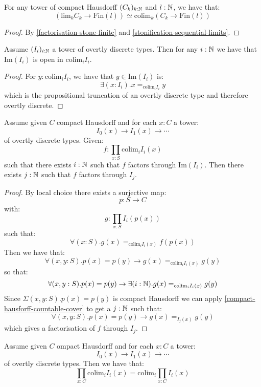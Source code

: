 \begin{lemma}\label{factorisation-compact-hausdorff-finite}
For any tower of compact Hausdorff $(C_k)_{k:\mathbb{N}}$ and $l:\mathbb{N}$, we have that:
\[\left(\mathrm{lim}_kC_k\to \mathrm{Fin}(l)\right) \simeq \mathrm{colim}_k (C_k\to \mathrm{Fin}(l))\]
\end{lemma}

\begin{proof}
By \cref{factorisation-stone-finite} and \cref{stonification-sequential-limits}.
\end{proof}

\begin{lemma}\label{overtly-discrete-union-open}
Assume $(I_i)_{i:\mathbb{N}}$ a tower of overtly discrete types. Then for any $i:\mathbb{N}$ we have that $\mathrm{Im}(I_i)$ is open in $\mathrm{colim}_i I_i$. 
\end{lemma}

\begin{proof}
For $y:\mathrm{colim}_iI_i$, we have that $y\in \mathrm{Im}(I_i)$ is:
\[\exists(x:I_i). x=_{\mathrm{colim}_iI_i}y\]
which is the propositional truncation of an overtly discrete type and therefore overtly discrete.
\end{proof}


\begin{lemma}\label{factorisation-image-true-factorisation}
Assume given $C$ compact Hausdorff and for each $x:C$ a tower:
\[I_0(x)\to I_1(x)\to \cdots\]
of overtly discrete types. Given:
\[f:\prod_{x:S}\mathrm{colim}_i I_i(x)\]
such that there exists $i:\mathbb{N}$ such that $f$ factors through $\mathrm{Im}(I_i)$. Then there exists $j:\mathbb{N}$ such that $f$ factors through $I_j$.
\end{lemma}

\begin{proof}
By local choice there exists a surjective map:
\[p:S\to C\]
with:
\[g:\prod_{x:S} I_i(p(x))\]
such that:
\[\forall(x:S). g(x) =_{\mathrm{colim}_i I_i(x)} f(p(x))\]
Then we have that:
\[\forall(x,y:S). p(x)=p(y) \to g(x) =_{\mathrm{colim}_i I_i(x)} g(y)\]
so that:
\[\forall(x,y:S). p(x)=p(y) \to \exists(i:\mathbb{N}). g(x) =_{\mathrm{colim}_i I_i(x)} g(y)\]
Since $\Sigma(x,y:S). p(x)=p(y)$ is compact Hausdorff we can apply \cref{compact-hausforff-countable-cover} to get a $j:\mathbb{N}$ such that:
\[\forall(x,y:S). p(x)=p(y) \to g(x) =_{I_j(x)} g(y)\]
which gives a factorisation of $f$ through $I_j$.
\end{proof}

\begin{lemma}\label{scott-continuity-right}
Assume given $C$ ompact Hausdorff and for each $x:C$ a tower:
\[I_0(x)\to I_1(x)\to \cdots\]
of overtly discrete types. Then we have that:
\[\prod_{x:C} \mathrm{colim}_{i} I_i(x) = \mathrm{colim}_{i} \prod_{x:C} I_i(x)\]
\end{lemma}

